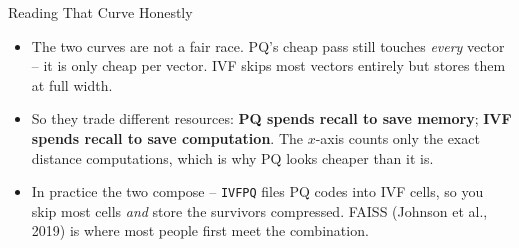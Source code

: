 \begin{frame}{Reading That Curve Honestly}
\begin{itemize}
  \item The two curves are not a fair race. PQ's cheap pass still touches \emph{every} vector -- it is only cheap per vector. IVF skips most vectors entirely but stores them at full width.
  \pause
  \item So they trade different resources: \textbf{PQ spends recall to save memory}; \textbf{IVF spends recall to save computation}. The $x$-axis counts only the exact distance computations, which is why PQ looks cheaper than it is.
  \pause
  \item In practice the two compose -- \texttt{IVFPQ} files PQ codes into IVF cells, so you skip most cells \emph{and} store the survivors compressed. FAISS (Johnson et al., 2019) is where most people first meet the combination.
\end{itemize}
\end{frame}

